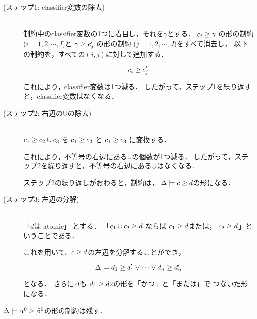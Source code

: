 \begin{description}
\item[(ステップ1: classifier変数の除去)]\mbox{}\\
  制約中のclassifier変数の1つに着目し，それを$\gamma$とする．
  ${c_i} \ge {\gamma}$ の形の制約 ($i=1,2,\cdots,I$)と
  ${\gamma} \ge {c'_j}$ の形の制約 ($j=1,2,\cdots,J$)をすべて消去し，
  以下の制約を，すべての$(i,j)$に対して追加する．

  \[
    {c_i} \ge {c'_j}
  \]

  これにより，classifier変数は1つ減る．%
  したがって，ステップ1を繰り返すと，classifier変数はなくなる．

\item[(ステップ2: 右辺の$\cup$の除去)]\mbox{}\\
  ${c_1} \ge {c_2 \cup c_3}$ を
  ${c_1} \ge {c_2}$ と
  ${c_1} \ge {c_3}$ に変換する．

  これにより，不等号の右辺にある$\cup$の個数が1つ減る．
  したがって，ステップ2を繰り返すと，不等号の右辺にある$\cup$はなくなる．

  ステップ2の繰り返しがおわると，制約は，
  $\Delta \models {c} \ge {d}$の形になる．


\item[(ステップ3: 左辺の分解)] \mbox{}\\
  「$d$は atomic」 とする．
  「${c_1 \cup c_2} \ge {d}$ ならば
  ${c_1} \ge {d}$または，
  ${c_2} \ge {d}$」ということである．

  これを用いて、${c} \ge {d}$の左辺を分解することができ，

  \[
    \Delta \models {d_1} \ge {d_1'} \vee \cdots \vee {d_n} \ge {d'_n}
  \]

  となる．
  さらに$\Delta$も ${d1} \ge {d2}$の形を「かつ」と「または」で
  つないだ形になる．

\end{description}

$\Delta \models {\alpha^0} \ge {\beta^0}$の形の制約は残す．


